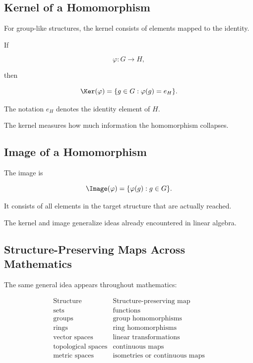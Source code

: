 \subsection{Kernel of a Homomorphism}
\label{subsec:kernel-homomorphism}

For group-like structures, the kernel consists of elements mapped to the
identity.

If

\[ \varphi:G\to H, \]

then

\[ \Ker(\varphi)=\{g\in G:\varphi(g)=e_H\}. \]

The notation \(e_H\) denotes the identity element of \(H\).

The kernel measures how much information the homomorphism collapses.

\subsection{Image of a Homomorphism}
\label{subsec:image-homomorphism}

The image is

\[ \Image(\varphi)=\{\varphi(g):g\in G\}. \]

It consists of all elements in the target structure that are actually reached.

The kernel and image generalize ideas already encountered in linear algebra.

\subsection{Structure-Preserving Maps Across Mathematics}
\label{subsec:structure-preserving-maps}

The same general idea appears throughout mathematics:

\[
\begin{array}{c|c}
\text{Structure} & \text{Structure-preserving map}\\
\hline
\text{sets} & \text{functions}\\
\text{groups} & \text{group homomorphisms}\\
\text{rings} & \text{ring homomorphisms}\\
\text{vector spaces} & \text{linear transformations}\\
\text{topological spaces} & \text{continuous maps}\\
\text{metric spaces} & \text{isometries or continuous maps}
\end{array}
\]


